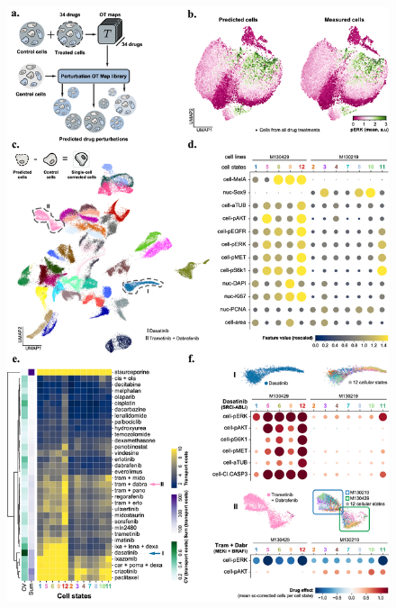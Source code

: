 \begin{figure}
    \centering
    \includegraphics[width=\textwidth]{figures/fig_biological_analysis.png}
\end{figure}

